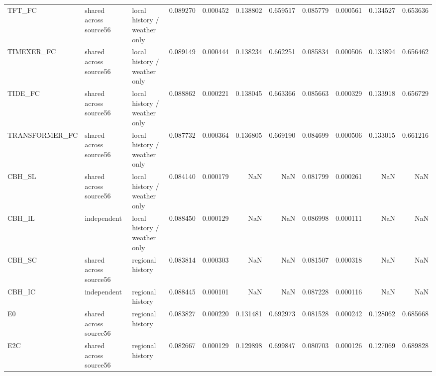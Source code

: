 \begin{tabular}{lllrrrrrrrr}
TFT\_FC & shared across source56 & local history / weather only & 0.089270 & 0.000452 & 0.138802 & 0.659517 & 0.085779 & 0.000561 & 0.134527 & 0.653636 \\
TIMEXER\_FC & shared across source56 & local history / weather only & 0.089149 & 0.000444 & 0.138234 & 0.662251 & 0.085834 & 0.000506 & 0.133894 & 0.656462 \\
TIDE\_FC & shared across source56 & local history / weather only & 0.088862 & 0.000221 & 0.138045 & 0.663366 & 0.085663 & 0.000329 & 0.133918 & 0.656729 \\
TRANSFORMER\_FC & shared across source56 & local history / weather only & 0.087732 & 0.000364 & 0.136805 & 0.669190 & 0.084699 & 0.000506 & 0.133015 & 0.661216 \\
CBH\_SL & shared across source56 & local history / weather only & 0.084140 & 0.000179 & NaN & NaN & 0.081799 & 0.000261 & NaN & NaN \\
CBH\_IL & independent & local history / weather only & 0.088450 & 0.000129 & NaN & NaN & 0.086998 & 0.000111 & NaN & NaN \\
CBH\_SC & shared across source56 & regional history & 0.083814 & 0.000303 & NaN & NaN & 0.081507 & 0.000318 & NaN & NaN \\
CBH\_IC & independent & regional history & 0.088445 & 0.000101 & NaN & NaN & 0.087228 & 0.000116 & NaN & NaN \\
E0 & shared across source56 & regional history & 0.083827 & 0.000220 & 0.131481 & 0.692973 & 0.081528 & 0.000242 & 0.128062 & 0.685668 \\
E2C & shared across source56 & regional history & 0.082667 & 0.000129 & 0.129898 & 0.699847 & 0.080703 & 0.000126 & 0.127069 & 0.689828 \\
\bottomrule
\end{tabular}
